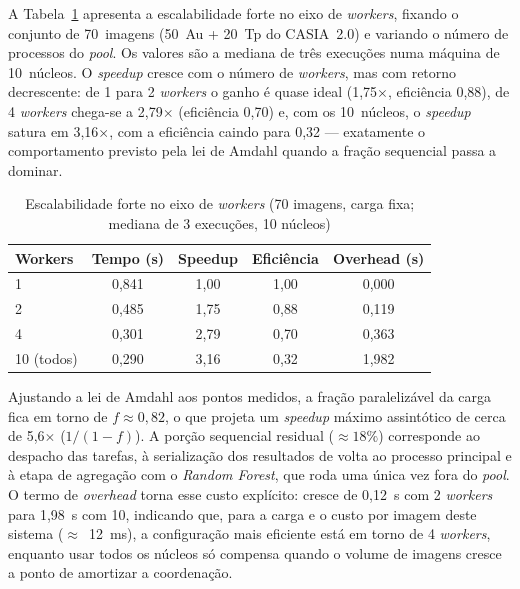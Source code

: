 \documentclass[12pt]{article}
\begin{document}
A Tabela~\ref{tab:escalaforte} apresenta a escalabilidade forte no eixo de
\textit{workers}, fixando o conjunto de 70~imagens (50~Au + 20~Tp do CASIA~2.0)
e variando o número de processos do \textit{pool}. Os valores são a mediana de
três execuções numa máquina de 10~núcleos. O \textit{speedup} cresce com o número
de \textit{workers}, mas com retorno decrescente: de 1 para 2 \textit{workers} o
ganho é quase ideal (1,75$\times$, eficiência 0,88), de 4 \textit{workers}
chega-se a 2,79$\times$ (eficiência 0,70) e, com os 10~núcleos, o \textit{speedup}
satura em 3,16$\times$, com a eficiência caindo para 0,32 --- exatamente o
comportamento previsto pela lei de Amdahl \cite{amdahl1967} quando a fração
sequencial passa a dominar.

\begin{table}[ht]
\centering
\caption{Escalabilidade forte no eixo de \textit{workers} (70 imagens, carga fixa; mediana de 3 execuções, 10 núcleos)}
\label{tab:escalaforte}
\begin{tabular}{lcccc}
\toprule
\textbf{Workers} & \textbf{Tempo (s)} & \textbf{Speedup} & \textbf{Eficiência} & \textbf{Overhead (s)} \\
\midrule
1               & 0{,}841 & 1{,}00 & 1{,}00 & 0{,}000 \\
2               & 0{,}485 & 1{,}75 & 0{,}88 & 0{,}119 \\
4               & 0{,}301 & 2{,}79 & 0{,}70 & 0{,}363 \\
10 (todos)      & 0{,}290 & 3{,}16 & 0{,}32 & 1{,}982 \\
\bottomrule
\end{tabular}
\end{table}

Ajustando a lei de Amdahl aos pontos medidos, a fração paralelizável da carga
fica em torno de $f \approx 0{,}82$, o que projeta um \textit{speedup} máximo
assintótico de cerca de 5,6$\times$ ($1/(1-f)$). A porção sequencial residual
($\approx 18\%$) corresponde ao despacho das tarefas, à serialização dos
resultados de volta ao processo principal e à etapa de agregação com o
\textit{Random Forest}, que roda uma única vez fora do \textit{pool}. O termo de
\textit{overhead} torna esse custo explícito: cresce de 0,12~s com 2
\textit{workers} para 1,98~s com 10, indicando que, para a carga e o custo por
imagem deste sistema ($\approx$~12~ms), a configuração mais eficiente está em
torno de 4 \textit{workers}, enquanto usar todos os núcleos só compensa quando o
volume de imagens cresce a ponto de amortizar a coordenação.
\end{document}
